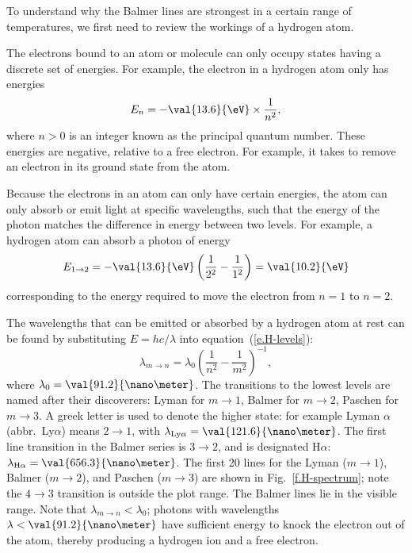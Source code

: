 To understand why the Balmer lines are strongest in a certain range of temperatures, we first need to review the workings of a hydrogen atom.

The electrons bound to an atom or molecule can only occupy states having a discrete set of energies. For example, the electron in a hydrogen atom only has energies
\begin{equation}\label{e.H-levels}
        E_{n} = -\val{13.6}{\eV}\times \frac{1}{n^{2}},
\end{equation}
where $n > 0$ is an integer known as the principal quantum number.  These energies are negative, relative to a free electron.  For example, it takes  to remove an electron in its ground state from the atom.

Because the electrons in an atom can only have certain energies, the atom can only absorb or emit light at specific wavelengths, such that the energy of the photon matches the difference in energy between two levels.  For example, a hydrogen atom can absorb a photon of energy
\[
        E_{1\to2} = -\val{13.6}{\eV} \left(\frac{1}{2^{2}} - \frac{1}{1^{2}}\right)
                 = \val{10.2}{\eV}
\]
corresponding to the energy required to move the electron from  $n=1$ to $n=2$.

The wavelengths that can be emitted or absorbed by a hydrogen atom at rest can be found by substituting $E = hc/\lambda$ into equation~(\ref{e.H-levels}):
\begin{equation}
        \lambda_{m\to n} = \lambda_{0}\left(\frac{1}{n^{2}}-\frac{1}{m^{2}}\right)^{-1},
\end{equation}
where $\lambda_{0} = \val{91.2}{\nano\meter}$.
The transitions to the lowest levels are named after their discoverers: Lyman for $m\to1$, Balmer for $m\to2$, Paschen for $m\to3$. A greek letter is used to denote the higher state: for example Lyman $\alpha$ (abbr.\ Ly$\alpha$) means $2\to1$, with $\lambda_{\mathrm{Ly}\alpha} = \val{121.6}{\nano\meter}$.  The first line transition in the Balmer series is $3\to2$, and is designated H$\alpha$: $\lambda_{\mathrm{H}\alpha} = \val{656.3}{\nano\meter}$. The first 20 lines for the Lyman ($m\to1$), Balmer ($m\to2$), and Paschen ($m\to3$) are shown in Fig.~\ref{f.H-spectrum}; note the $4\to3$ transition is outside the plot range. The Balmer lines lie in the visible range. Note that $\lambda_{m\to n} < \lambda_{0}$; photons with wavelengths $\lambda < \val{91.2}{\nano\meter}$ have sufficient energy to knock the electron out of the atom, thereby producing a hydrogen ion and a free electron.

